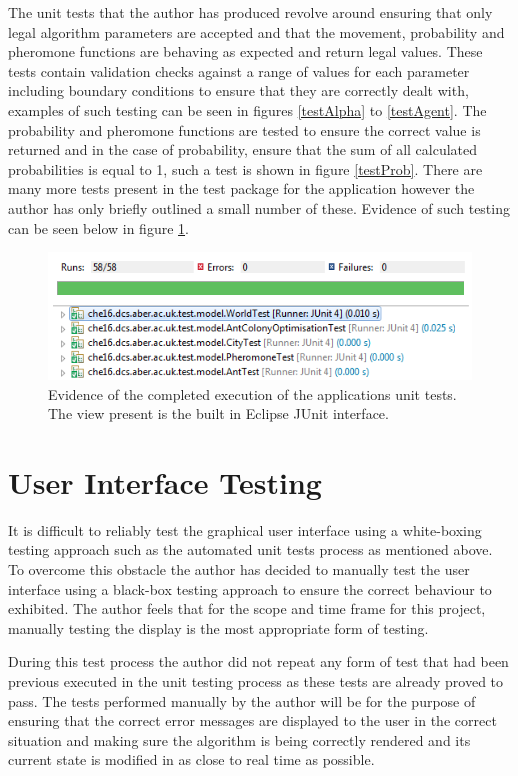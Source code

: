 The unit tests that the author has produced revolve around ensuring that only legal algorithm parameters are accepted and that the movement, probability and pheromone functions are behaving as expected and return legal values. These tests contain validation checks against a range of values for each parameter including boundary conditions to ensure that they are correctly dealt with, examples of such testing can be seen in figures \ref{testAlpha} to \ref{testAgent}. The probability and pheromone functions are tested to ensure the correct value is returned and in the case of probability, ensure that the sum of all calculated probabilities is equal to 1, such a test is shown in figure \ref{testProb}. There are many more tests present in the test package for the application however the author has only briefly outlined a small number of these. Evidence of such testing can be seen below in figure \ref{testSS}.

\begin{figure}[H]
\centering
\includegraphics[scale=0.8]{Images/chapter6/testSS}
\caption{Evidence of the completed execution of the applications unit tests. The view present is the built in Eclipse JUnit interface.}
\label{testSS}
\end{figure}

\section{User Interface Testing}

It is difficult to reliably test the graphical user interface using a white-boxing testing approach such as the automated unit tests process as mentioned above. To overcome this obstacle the author has decided to manually test the user interface using a black-box testing approach to ensure the correct behaviour to exhibited. The author feels that for the scope and time frame for this project, manually testing the display is the most appropriate form of testing.

During this test process the author did not repeat any form of test that had been previous executed in the unit testing process as these tests are already proved to pass. The tests performed manually by the author will be for the purpose of ensuring that the correct error messages are displayed to the user in the correct situation and making sure the algorithm is being correctly rendered and its current state is modified in as close to real time as possible. 

